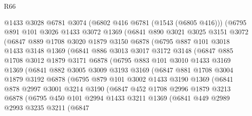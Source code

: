 \begin{lexlean}{R66}
\begin{coremodule}
      @1433
      @3028
      @6781
      @3074
      (@6802 @416 @6781 (@1543 (@6805 @416)))
      (@6795
        @891
        @101
        @3026
        @1433
        @3072
        @1369
        (@6841
          @890
          @3021
          @3025
          @3151
          @3072
          (@6847
            @889
            @1708
            @3020
            @1879
            @3150
            @6878
            (@6795
              @887
              @101
              @3018
              @1433
              @3148
              @1369
              (@6841
                @886
                @3013
                @3017
                @3172
                @3148
                (@6847
                  @885
                  @1708
                  @3012
                  @1879
                  @3171
                  @6878
                  (@6795
                    @883
                    @101
                    @3010
                    @1433
                    @3169
                    @1369
                    (@6841
                      @882
                      @3005
                      @3009
                      @3193
                      @3169
                      (@6847
                        @881
                        @1708
                        @3004
                        @1879
                        @3192
                        @6878
                        (@6795
                          @879
                          @101
                          @3002
                          @1433
                          @3190
                          @1369
                          (@6841
                            @878
                            @2997
                            @3001
                            @3214
                            @3190
                            (@6847
                              @452
                              @1708
                              @2996
                              @1879
                              @3213
                              @6878
                              (@6795
                                @450
                                @101
                                @2994
                                @1433
                                @3211
                                @1369
                                (@6841
                                  @449
                                  @2989
                                  @2993
                                  @3235
                                  @3211
                                  (@6847

\end{coremodule}
\end{lexlean}
